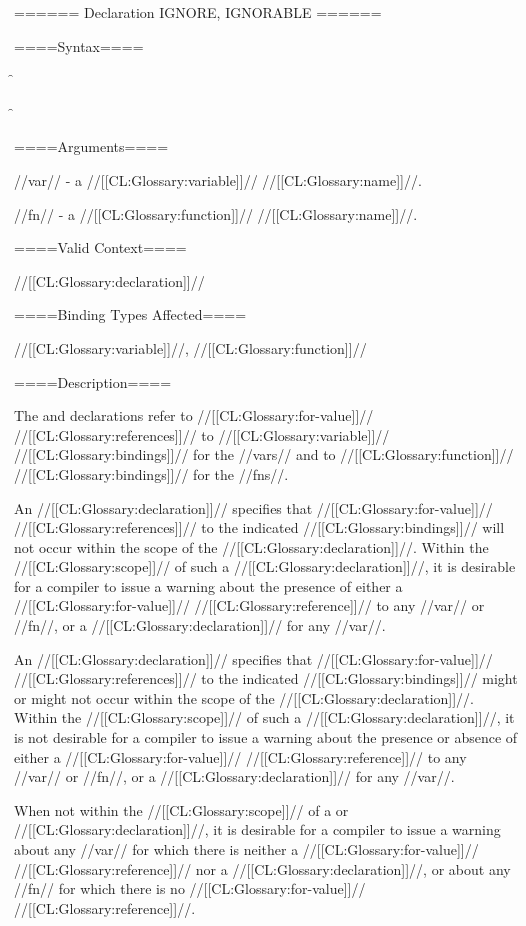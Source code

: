 ====== Declaration IGNORE, IGNORABLE ======

====Syntax====

\f{}

\f{}

====Arguments====

//var// - a //[[CL:Glossary:variable]]// //[[CL:Glossary:name]]//.

//fn// - a //[[CL:Glossary:function]]// //[[CL:Glossary:name]]//.

====Valid Context====

//[[CL:Glossary:declaration]]//

====Binding Types Affected====

//[[CL:Glossary:variable]]//, //[[CL:Glossary:function]]//

====Description====

The  and  declarations refer to //[[CL:Glossary:for-value]]// //[[CL:Glossary:references]]// to //[[CL:Glossary:variable]]// //[[CL:Glossary:bindings]]// for the //vars// and to //[[CL:Glossary:function]]// //[[CL:Glossary:bindings]]// for the //fns//.

An  //[[CL:Glossary:declaration]]// specifies that //[[CL:Glossary:for-value]]// //[[CL:Glossary:references]]// to the indicated //[[CL:Glossary:bindings]]// will not occur within the scope of the //[[CL:Glossary:declaration]]//. Within the //[[CL:Glossary:scope]]// of such a //[[CL:Glossary:declaration]]//, it is desirable for a compiler to issue a warning about the presence of either a //[[CL:Glossary:for-value]]// //[[CL:Glossary:reference]]// to any //var// or //fn//, or a  //[[CL:Glossary:declaration]]// for any //var//.

An  //[[CL:Glossary:declaration]]// specifies that //[[CL:Glossary:for-value]]// //[[CL:Glossary:references]]// to the indicated //[[CL:Glossary:bindings]]// might or might not occur within the scope of the //[[CL:Glossary:declaration]]//. Within the //[[CL:Glossary:scope]]// of such a //[[CL:Glossary:declaration]]//, it is not desirable for a compiler to issue a warning about the presence or absence of either a //[[CL:Glossary:for-value]]// //[[CL:Glossary:reference]]// to any //var// or //fn//, or a  //[[CL:Glossary:declaration]]// for any //var//.

When not within the //[[CL:Glossary:scope]]// of a  or  //[[CL:Glossary:declaration]]//, it is desirable for a compiler to issue a warning about any //var// for which there is neither a //[[CL:Glossary:for-value]]// //[[CL:Glossary:reference]]// nor a  //[[CL:Glossary:declaration]]//, or about any //fn// for which there is no //[[CL:Glossary:for-value]]// //[[CL:Glossary:reference]]//.

